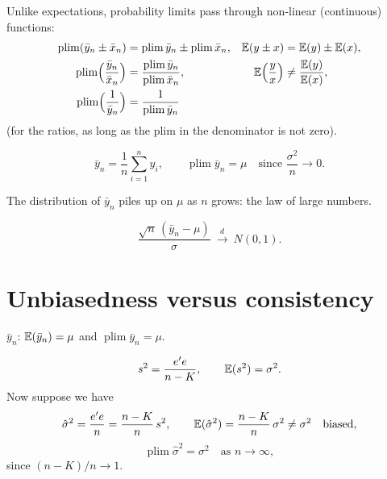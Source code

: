 \documentclass[11pt]{article}
\begin{document}
Unlike expectations, probability limits pass through non-linear (continuous)
functions:
\begin{align*}
  \operatorname*{plim}(\bar y_{n} \pm \bar x_{n})
    &= \operatorname*{plim}\bar y_{n} \pm \operatorname*{plim}\bar x_{n},
    & \mathbb{E}(y \pm x) &= \mathbb{E}(y) \pm \mathbb{E}(x),\\
  \operatorname*{plim}\Bigl(\frac{\bar y_{n}}{\bar x_{n}}\Bigr)
    &= \frac{\operatorname*{plim}\bar y_{n}}{\operatorname*{plim}\bar x_{n}},
    & \mathbb{E}\Bigl(\frac{y}{x}\Bigr) &\neq \frac{\mathbb{E}(y)}{\mathbb{E}(x)},\\
  \operatorname*{plim}\Bigl(\frac{1}{\bar y_{n}}\Bigr)
    &= \frac{1}{\operatorname*{plim}\bar y_{n}}
\end{align*}
(for the ratios, as long as the plim in the denominator is not zero).

\[ \bar y_{n} = \frac{1}{n}\sum_{i=1}^{n} y_{i}, \qquad
   \operatorname*{plim}\bar y_{n} = \mu \quad \text{since } \frac{\sigma^{2}}{n} \to 0. \]
\begin{center}
\end{center}
The distribution of $\bar y_{n}$ piles up on $\mu$ as $n$ grows: the law of large
numbers.

\[ \frac{\sqrt{n}\,(\bar y_{n} - \mu)}{\sigma} \ \xrightarrow{\ d\ }\ N(0, 1). \]


\section{Unbiasedness versus consistency}

$\bar y_{n}$\quad\checkmark: $\mathbb{E}(\bar y_{n}) = \mu$ and $\operatorname*{plim}\bar y_{n} = \mu$.

\[ s^{2} = \frac{e'e}{n - K}, \qquad \mathbb{E}(s^{2}) = \sigma^{2}. \]
Now suppose we have
\[ \hat\sigma^{2} = \frac{e'e}{n} = \frac{n - K}{n}\,s^{2}, \qquad
   \mathbb{E}(\hat\sigma^{2}) = \frac{n - K}{n}\,\sigma^{2} \neq \sigma^{2}
   \quad\text{biased}, \]
\[ \operatorname*{plim}\hat\sigma^{2} = \sigma^{2} \quad \text{as } n \to \infty, \]
since $(n - K)/n \to 1$.
\end{document}
